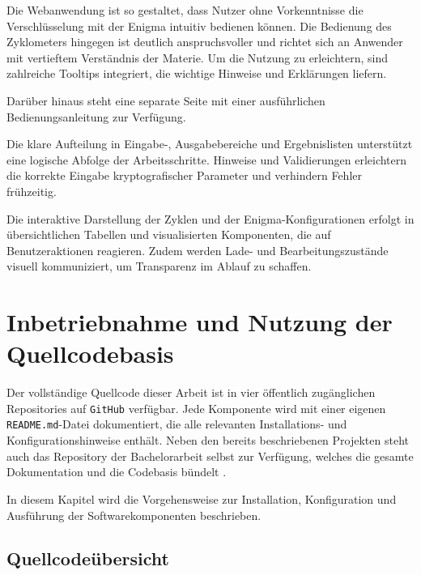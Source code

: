 \documentclass[12pt, ngerman, a4paper, numbers=noenddot]{article}
\begin{document}
Die Webanwendung ist so gestaltet, dass Nutzer ohne Vorkenntnisse die Verschlüsselung mit der Enigma intuitiv bedienen können. Die Bedienung des Zyklometers hingegen ist deutlich anspruchsvoller und richtet sich an Anwender mit vertieftem Verständnis der Materie. Um die Nutzung zu erleichtern, sind zahlreiche Tooltips integriert, die wichtige Hinweise und Erklärungen liefern.

Darüber hinaus steht eine separate Seite mit einer ausführlichen Bedienungsanleitung zur Verfügung.

Die klare Aufteilung in Eingabe-, Ausgabebereiche und Ergebnislisten unterstützt eine logische Abfolge der Arbeitsschritte. Hinweise und Validierungen erleichtern die korrekte Eingabe kryptografischer Parameter und verhindern Fehler frühzeitig.

Die interaktive Darstellung der Zyklen und der Enigma-Konfigurationen erfolgt in übersichtlichen Tabellen und visualisierten Komponenten, die auf Benutzeraktionen reagieren. Zudem werden Lade- und Bearbeitungszustände visuell kommuniziert, um Transparenz im Ablauf zu schaffen.


\newpage
\section{Inbetriebnahme und Nutzung der Quellcodebasis}
\label{sec:nutzung}

Der vollständige Quellcode dieser Arbeit ist in vier öffentlich zugänglichen Repositories auf \lstinline|GitHub| verfügbar. Jede Komponente wird mit einer eigenen \lstinline|README.md|-Datei dokumentiert, die alle relevanten Installations- und Konfigurationshinweise enthält. Neben den bereits beschriebenen Projekten steht auch das Repository der Bachelorarbeit selbst zur Verfügung, welches die gesamte Dokumentation und die Codebasis bündelt \autocite{bibblecode2025enigmazyklometer}.

In diesem Kapitel wird die Vorgehensweise zur Installation, Konfiguration und Ausführung der Softwarekomponenten beschrieben.


\subsection{Quellcodeübersicht}
\end{document}
